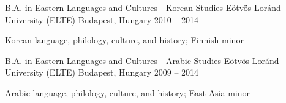 \begin{cventries}
  \cventry
    {B.A. in Eastern Languages and Cultures - Korean Studies} %
    {Eötvös Loránd University (ELTE)} %
    {Budapest, Hungary} %
    {2010 -- 2014} %
    {
      \begin{cvitems} %
        \item {Korean language, philology, culture, and history; Finnish minor}
      \end{cvitems}
    }

  \cventry
    {B.A. in Eastern Languages and Cultures - Arabic Studies} %
    {Eötvös Loránd University (ELTE)} %
    {Budapest, Hungary} %
    {2009 -- 2014} %
    {
      \begin{cvitems} %
        \item {Arabic language, philology, culture, and history; East Asia minor}
      \end{cvitems}
    }

\end{cventries}

